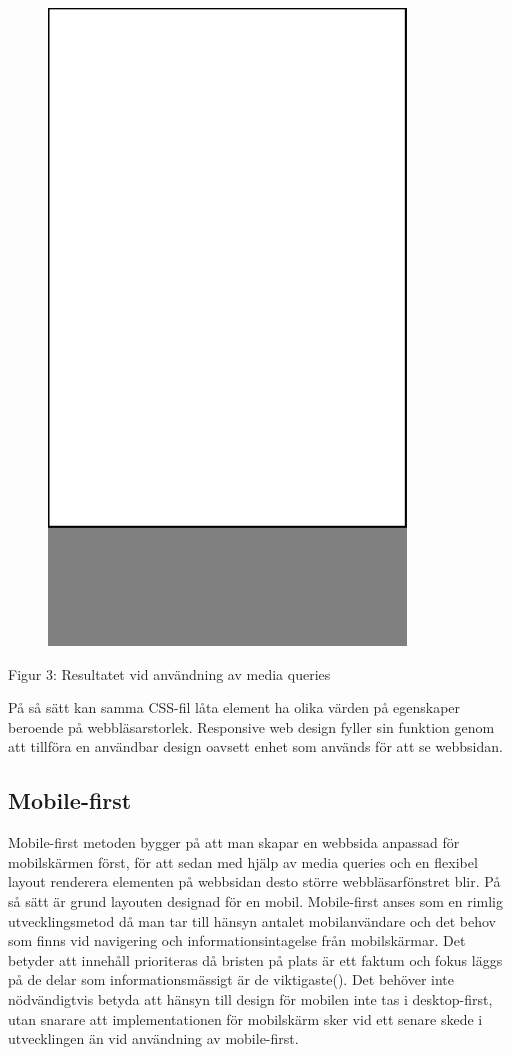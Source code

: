 \documentclass[11pt]{article}
\begin{document}
\vspace{1cm}
\begin{figure}[h]
\centerline{%
\includegraphics[scale=0.25]{pics/mobilesmall.png}
}
\end{figure}
\centerline{Figur 3: Resultatet vid användning av media queries}
\vspace{0.5cm}

På så sätt kan samma CSS-fil låta element ha olika värden på egenskaper beroende på webbläsarstorlek. Responsive web design fyller sin funktion genom att tillföra en användbar design oavsett enhet som används för att se webbsidan. 
\newpage

\subsection{Mobile-first}
Mobile-first metoden bygger på att man skapar en webbsida anpassad för mobilskärmen först, för att sedan med hjälp av media queries och en flexibel layout renderera elementen på webbsidan desto större webbläsarfönstret blir.  På så sätt är grund layouten designad för en mobil. Mobile-first anses som en rimlig utvecklingsmetod då man tar till hänsyn antalet mobilanvändare och det behov som finns vid navigering och informationsintagelse från mobilskärmar.  Det betyder att innehåll prioriteras då bristen på plats är ett faktum och fokus läggs på de delar som informationsmässigt är de viktigaste(\cite{Mobilefirst}). Det behöver inte nödvändigtvis betyda att hänsyn till design för mobilen inte tas i desktop-first, utan snarare att implementationen för mobilskärm sker vid ett senare skede i utvecklingen än vid användning av mobile-first.
\end{document}
